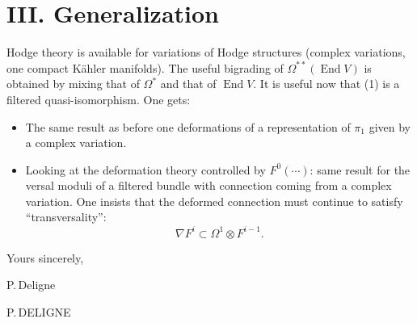 \documentclass[11pt,a4paper]{article}
\DeclareMathOperator{\End}{End}
\begin{document}
\section*{III. Generalization}

Hodge theory is available for variations of Hodge structures (complex variations, one compact K\"ahler manifolds). The useful bigrading of $\Omega^{**}(\End V)$ is obtained by mixing that of $\Omega^*$ and that of $\End V$. It is useful now that (1) is a filtered quasi-isomorphism. One gets:

\vspace{0.2cm}

\begin{itemize}[leftmargin=1cm]
\item[a)] The same result as before one deformations of a representation of $\pi_1$ given by a complex variation.
\item[b)] Looking at the deformation theory controlled by $F^0(\cdots)$: same result for the versal moduli of a filtered bundle with connection coming from a complex variation. One insists that the deformed connection must continue to satisfy ``transversality'':
\[
\nabla F^i \subset \Omega^1 \otimes F^{i-1}.
\]
\end{itemize}

\vspace{1.5cm}

\begin{flushright}
Yours sincerely,

\vspace{0.8cm}
P.\,Deligne

\vspace{0.2cm}
P.\,DELIGNE
\end{flushright}
\end{document}
